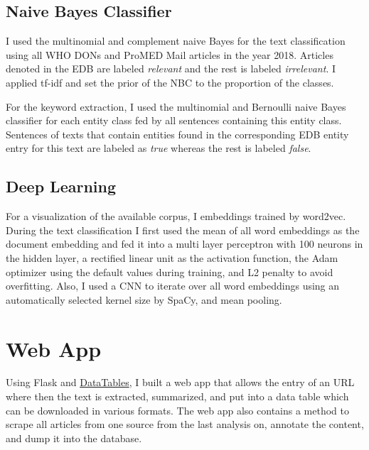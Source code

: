 \subsection{Naive Bayes Classifier}
I used the multinomial and complement naive Bayes for the text classification using all WHO DONs and ProMED Mail articles in the year 2018. Articles denoted in the EDB are labeled \emph{relevant} and the rest is labeled \emph{irrelevant}. I applied tf-idf and set the prior of the NBC to  the proportion of the classes.

 For the keyword extraction, I used the multinomial and Bernoulli naive Bayes classifier for each entity class fed by all sentences containing this entity class. Sentences of texts that contain entities found in the corresponding EDB entity entry for this text are labeled as \emph{true} whereas the rest is labeled \emph{false}.

\subsection{Deep Learning}
For a visualization of the available corpus, I embeddings trained by word2vec. During the text classification I first used the mean of all word embeddings as the document embedding and fed it into a multi layer perceptron with 100 neurons in the hidden layer, a rectified linear unit as the activation function, the Adam optimizer using the default values during training, and L2 penalty to avoid overfitting.
Also, I used a CNN to iterate over all word embeddings using an automatically selected kernel size by SpaCy, and mean pooling.

\section{Web App}
Using Flask and \href{https://www.datatables.net}{DataTables}, I built a web app that allows the entry of an URL where then the text is extracted, summarized, and put into a data table which can be downloaded in various formats.
The web app also contains a method to scrape all articles from one source from the last analysis on, annotate the content, and dump it into the database.

